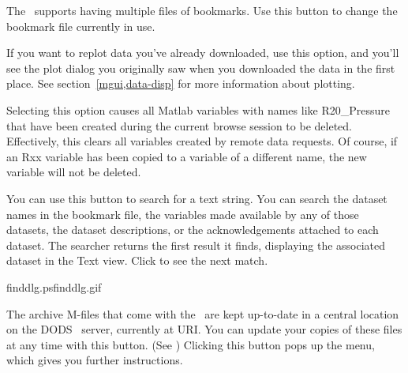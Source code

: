 
The \GUI\ supports having multiple files of bookmarks.  Use this
button to change the bookmark file currently in use.



If you want to replot data you've already downloaded, use this option,
and you'll see the plot dialog you originally saw when you downloaded
the data in the first place.  See section~\ref{mgui,data-disp} for
more information about plotting.



Selecting this option causes all Matlab variables with names like
R20\_Pressure that have been created during the current browse session
to be deleted. Effectively, this clears all variables created by
remote data requests. Of course, if an Rxx variable has been copied to
a variable of a different name, the new variable will not be deleted.


You can use this button to search for a text string.  You can search
the dataset names in the bookmark file, the variables made available
by any of those datasets, the dataset descriptions, or the
acknowledgements attached to each dataset.  The searcher returns the
first result it finds, displaying the associated dataset in the Text
view.  Click  to see the next match.

{finddlg.ps}{finddlg.gif}{}


The archive M-files that come with the \GUI\ are kept up-to-date in a
central location on the DODS \GUI\ server, currently at
  URI.  You can update your
copies of these files at any time with this button. (See
) Clicking this button pops up the
 menu, which gives you further instructions.


